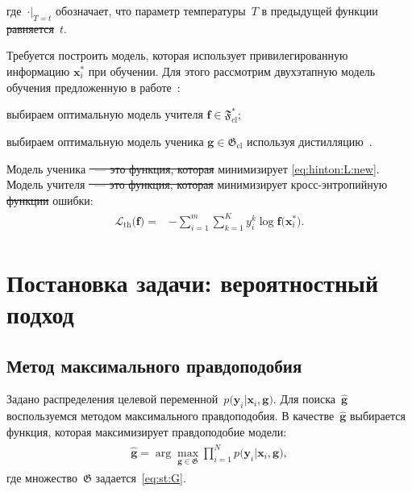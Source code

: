 \documentclass[12pt]{a&t}
\providecommand{\DIFadd}[1]{{\protect\color{blue}\uwave{#1}}} %
\providecommand{\DIFdel}[1]{{\protect\color{red}\sout{#1}}}                      %
\providecommand{\DIFaddbegin}{} %
\providecommand{\DIFaddend}{} %
\providecommand{\DIFdelbegin}{} %
\providecommand{\DIFdelend}{} %
\newcommand{\DIFscaledelfig}{0.5}
\newlength{\DIFdelgraphicswidth} %
\newlength{\DIFdelgraphicsheight} %
\newcommand{\DIFaddincludegraphics}[2][]{{\color{blue}\fbox{\DIFOincludegraphics[#1]{#2}}}} %
\newcommand{\DIFdelincludegraphics}[2][]{%
\sbox{\DIFdelgraphicsbox}{\DIFOincludegraphics[#1]{#2}}%
\settoboxwidth{\DIFdelgraphicswidth}{\DIFdelgraphicsbox} %
\settoboxtotalheight{\DIFdelgraphicsheight}{\DIFdelgraphicsbox} %
\scalebox{\DIFscaledelfig}{%
\parbox[b]{\DIFdelgraphicswidth}{\usebox{\DIFdelgraphicsbox}\\[-\baselineskip] \rule{\DIFdelgraphicswidth}{0em}}\llap{\resizebox{\DIFdelgraphicswidth}{\DIFdelgraphicsheight}{%
\setlength{\unitlength}{\DIFdelgraphicswidth}%
\begin{picture}(1,1)%
\thicklines\linethickness{2pt} %
{\color[rgb]{1,0,0}\put(0,0){\framebox(1,1){}}}%
{\color[rgb]{1,0,0}\put(0,0){\line( 1,1){1}}}%
{\color[rgb]{1,0,0}\put(0,1){\line(1,-1){1}}}%
\end{picture}%
}\hspace*{3pt}}} %
} %
\DeclareRobustCommand{\DIFaddbegin}{\DIFOaddbegin \let\includegraphics\DIFaddincludegraphics} %
\DeclareRobustCommand{\DIFaddend}{\DIFOaddend \let\includegraphics\DIFOincludegraphics} %
\DeclareRobustCommand{\DIFdelbegin}{\DIFOdelbegin \let\includegraphics\DIFdelincludegraphics} %
\DeclareRobustCommand{\DIFdelend}{\DIFOaddend \let\includegraphics\DIFOincludegraphics} %
\begin{document}
где~$\cdot\bigr|_{T=t}$ обозначает, что параметр температуры~$T$ в предыдущей функции \DIFdelbegin \DIFdel{равняется}\DIFdelend \DIFaddbegin \DIFadd{равен}\DIFaddend ~$t$.

Требуется построить модель, которая использует привилегированную информацию $\mathbf{x}^*_i$ при обучении. Для этого рассмотрим двухэтапную модель обучения предложенную в работе~\cite{Lopez2016}:
\begin{enumlist}
    \item выбираем оптимальную модель учителя $\mathbf{f} \in \mathfrak{F}_{\text{cl}}^*$;
    \item выбираем оптимальную модель ученика $\mathbf{g} \in \mathfrak{G}_{\text{cl}}$ используя дистилляцию~\cite{Hinton2015}. 
\end{enumlist}

Модель ученика \DIFdelbegin \DIFdel{~--- это функция, которая }\DIFdelend минимизирует \eqref{eq:hinton:L:new}. Модель учителя \DIFdelbegin \DIFdel{~--- это функция, которая }\DIFdelend минимизирует кросс-энтропийную \DIFdelbegin \DIFdel{функции }\DIFdelend \DIFaddbegin \DIFadd{функцию }\DIFaddend ошибки:
\begin{gather}
\label{eq:hinton.2}
\DIFdelbegin %
\DIFdelend \DIFaddbegin \begin{aligned}
   \mathcal{L}_\text{th}\bigr(\mathbf{f}\bigr) = &-\sum_{i=1}^{m}{{\sum_{k=1}^{K}y^k_i\log\mathbf{f}\bigr(\mathbf{x}^*_i\bigr)}}.
   \end{aligned}\DIFaddend 
\end{gather}

\section{Постановка задачи: вероятностный подход}

\subsection{Метод максимального правдоподобия}
Задано распределения целевой переменной~$p\bigr(\mathbf{y}_i|\mathbf{x}_i, \mathbf{g}\bigr)$.
Для поиска~$\hat{\mathbf{g}}$ воспользуемся методом максимального правдоподобия. В качестве~$\hat{\mathbf{g}}$ выбирается функция, которая максимизирует правдоподобие модели:
\begin{gather}
\label{eq:st:7}
\begin{aligned}
\hat{\mathbf{g}} = \arg\max_{\mathbf{g}\in \mathfrak{G}} \prod_{i=1}^{N}p\bigr(\mathbf{y}_{i}|\mathbf{x}_i, \mathbf{g}\bigr),
\end{aligned}
\end{gather}
где множество~$\mathfrak{G}$ задается~\eqref{eq:st:G}.
\end{document}
